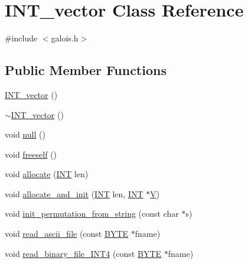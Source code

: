 \hypertarget{class_i_n_t__vector}{}\section{I\+N\+T\+\_\+vector Class Reference}
\label{class_i_n_t__vector}


{\ttfamily \#include $<$galois.\+h$>$}

\subsection*{Public Member Functions}
\begin{DoxyCompactItemize}
\item 
\mbox{\hyperlink{class_i_n_t__vector_a6c615763a83da3f628f9fcc74e9f15a2}{I\+N\+T\+\_\+vector}} ()
\item 
\mbox{\hyperlink{class_i_n_t__vector_a7e7d670c7149f6fb835e864be692f41d}{$\sim$\+I\+N\+T\+\_\+vector}} ()
\item 
void \mbox{\hyperlink{class_i_n_t__vector_aead7b6a3b0d430ccfd3e023132fb163c}{null}} ()
\item 
void \mbox{\hyperlink{class_i_n_t__vector_a383d3aaf29f03a22bab7a458c0605886}{freeself}} ()
\item 
void \mbox{\hyperlink{class_i_n_t__vector_acb3a236562329d1e2752003de9e44ae6}{allocate}} (\mbox{\hyperlink{galois_8h_a09fddde158a3a20bd2dcadb609de11dc}{I\+NT}} len)
\item 
void \mbox{\hyperlink{class_i_n_t__vector_a4d854da147ab1a8e8bb2940aa64bfd13}{allocate\+\_\+and\+\_\+init}} (\mbox{\hyperlink{galois_8h_a09fddde158a3a20bd2dcadb609de11dc}{I\+NT}} len, \mbox{\hyperlink{galois_8h_a09fddde158a3a20bd2dcadb609de11dc}{I\+NT}} $\ast$\mbox{\hyperlink{srg_8_c_af40a326b23c68a27cebe60f16634a2cb}{V}})
\item 
void \mbox{\hyperlink{class_i_n_t__vector_a73a03d4d965633ee099a7b66f3f78e35}{init\+\_\+permutation\+\_\+from\+\_\+string}} (const char $\ast$s)
\item 
void \mbox{\hyperlink{class_i_n_t__vector_ac39f7ae050d29ea8dadf2962c404aaba}{read\+\_\+ascii\+\_\+file}} (const \mbox{\hyperlink{galois_8h_ab6cc7b4aeb6ea31aba2b3fbfc83ff5e6}{B\+Y\+TE}} $\ast$fname)
\item 
void \mbox{\hyperlink{class_i_n_t__vector_a9dce169a497d15dcbf3f51726df20556}{read\+\_\+binary\+\_\+file\+\_\+\+I\+N\+T4}} (const \mbox{\hyperlink{galois_8h_ab6cc7b4aeb6ea31aba2b3fbfc83ff5e6}{B\+Y\+TE}} $\ast$fname)
\item 

\end{DoxyCompactItemize}
